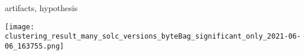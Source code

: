 
artifacts, hypothesis

\texttt{[image: clustering\_result\_many\_solc\_versions\_byteBag\_significant\_only\_2021-06-06\_163755.png]}

